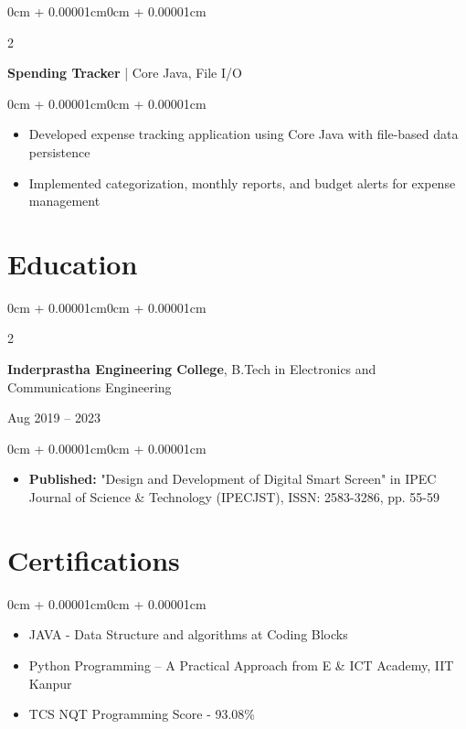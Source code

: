 \documentclass[11pt, letterpaper]{article}
\newenvironment{highlights}{
    \begin{itemize}[topsep=0.05cm, parsep=0.05cm, partopsep=0pt, itemsep=0pt, leftmargin=0cm + 8pt]
}{
    \end{itemize}
}
\newenvironment{onecolentry}{
    \begin{adjustwidth}{0cm + 0.00001cm}{0cm + 0.00001cm}
}{
    \end{adjustwidth}
}
\newenvironment{twocolentry}[2][]{
    \onecolentry
    \def\secondColumn{#2}
    \setcolumnwidth{\fill, 4.2cm}
    \begin{paracol}{2}
}{
    \switchcolumn \raggedleft \secondColumn
    \end{paracol}
    \endonecolentry
}
\begin{document}
    \vspace{0.1cm}

    \begin{twocolentry}{2022}
        \textbf{Spending Tracker} | Core Java, File I/O
    \end{twocolentry}

    \vspace{0.05cm}
    \begin{onecolentry}
        \begin{highlights}
            \item Developed expense tracking application using Core Java with file-based data persistence
            \item Implemented categorization, monthly reports, and budget alerts for expense management
        \end{highlights}
    \end{onecolentry}

    \section{Education}

   \begin{twocolentry}{Aug 2019 – 2023}
        \textbf{Inderprastha Engineering College}, B.Tech in Electronics and Communications Engineering
    \end{twocolentry}

    \vspace{0.05cm}
    \begin{onecolentry}
        \begin{highlights}
            \item \textbf{Published:} "Design and Development of Digital Smart Screen" in IPEC Journal of Science \& Technology (IPECJST), ISSN: 2583-3286, pp. 55-59
        \end{highlights}
    \end{onecolentry}

    \section{Certifications}
    \begin{onecolentry}
        \begin{highlights}
            \item JAVA - Data Structure and algorithms at Coding Blocks
            \item Python Programming – A Practical Approach from E \& ICT Academy, IIT Kanpur
            \item TCS NQT Programming Score - 93.08\%
        \end{highlights}
    \end{onecolentry}
\end{document}
